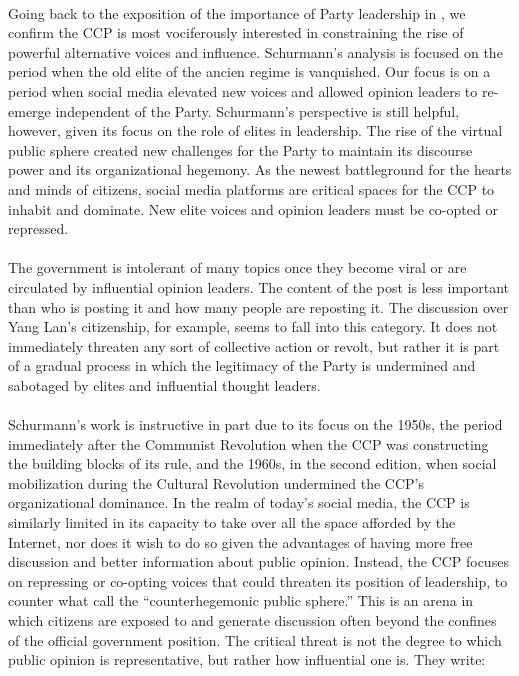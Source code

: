 \documentclass[12pt]{article}
\begin{document}
\begin{CJK*}{UTF8}{gbsn}
\paragraph{} Going back to the exposition of the importance of Party leadership in \cite{schurmann1968ideology}, we confirm the CCP is most vociferously interested in constraining the rise of powerful alternative voices and influence. Schurmann's analysis is focused on the period when the old elite of the ancien regime is vanquished. Our focus is on a period when social media elevated new voices and allowed opinion leaders to re-emerge independent of the Party. Schurmann's perspective is still helpful, however, given its focus on the role of elites in leadership. The rise of the virtual public sphere created new challenges for the Party to maintain its discourse power and its organizational hegemony. As the newest battleground for the hearts and minds of citizens, social media platforms are critical spaces for the CCP to inhabit and dominate. New elite voices and opinion leaders must be co-opted or repressed.
\paragraph{} The government is intolerant of many topics once they become viral or are circulated by influential opinion leaders. The content of the post is less important than who is posting it and how many people are reposting it. The discussion over Yang Lan's citizenship, for example, seems to fall into this category. It does not immediately threaten any sort of collective action or revolt, but rather it is part of a gradual process in which the legitimacy of the Party is undermined and sabotaged by elites and influential thought leaders.
\paragraph{} Schurmann's work is instructive in part due to its focus on the 1950s, the period immediately after the Communist Revolution when the CCP was constructing the building blocks of its rule, and the 1960s, in the second edition, when social mobilization during the Cultural Revolution undermined the CCP's organizational dominance. In the realm of today's social media, the CCP is similarly limited in its capacity to take over all the space afforded by the Internet, nor does it wish to do so given the advantages of having more free discussion and better information about public opinion. Instead, the CCP focuses on repressing or co-opting voices that could threaten its position of leadership, to counter what \cite{lei2015contesting} call the ``counterhegemonic public sphere.'' This is an arena in which citizens are exposed to and generate discussion often beyond the confines of the official government position. The critical threat is not the degree to which public opinion is representative, but rather how influential one is. They write:


\end{CJK*}
\end{document}
